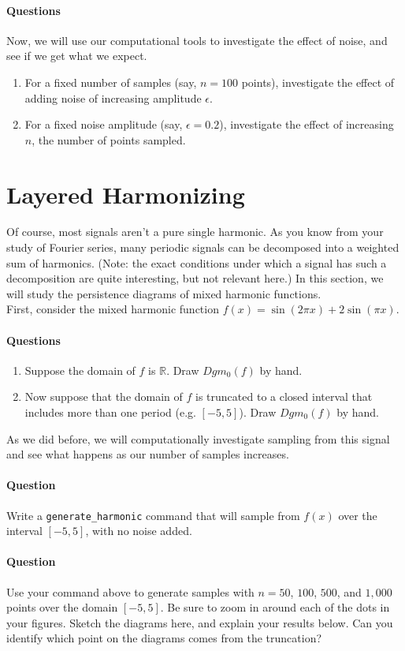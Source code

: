 \documentclass[12pt,twoside]{article}
\newcommand{\qns}{\paragraph*{Questions}}
\newcommand{\qn}{\paragraph*{Question}}
\begin{document}
\qns Now, we will use our computational tools to investigate the effect of noise, and see if we get what we expect.\begin{enumerate}
   \item For a fixed number of samples (say, $n=100$ points), investigate the effect of adding noise of increasing amplitude $\epsilon$.\vfill\vfill
   \item For a fixed noise amplitude (say, $\epsilon=0.2$), investigate the effect of increasing $n$, the number of points sampled.\vfill\vfill
\end{enumerate}

\pagebreak

\section{Layered Harmonizing}

Of course, most signals aren't a pure single harmonic.  As you know from your study of Fourier series, many periodic signals can be decomposed into a weighted sum of harmonics.  (Note: the exact conditions under which a signal has such a decomposition are quite interesting, but not relevant here.)  In this section, we will study the persistence diagrams of mixed harmonic functions.\\

First, consider the mixed harmonic function $f(x)=\sin(2\pi x)+2\sin(\pi x)$.  

\qns \begin{enumerate}   
   \item Suppose the domain of $f$ is $\mathbb{R}$.  Draw $Dgm_0(f)$ by hand.\vfill
   \item Now suppose that the domain of $f$ is truncated to a closed interval that includes more than one period (e.g. $[-5,5]$).  Draw $Dgm_0(f)$ by hand.\vfill
\end{enumerate}

As we did before, we will computationally investigate sampling from this signal and see what happens as our number of samples increases.

\qn Write a \verb|generate_harmonic| command that will sample from $f(x)$ over the interval $[-5,5]$, with no noise added.\vspace{0.5in}

\pagebreak

\qn Use your command above to generate samples with $n=50$, $100$, $500$, and $1,000$ points over the domain $[-5,5]$. Be sure to zoom in around each of the dots in your figures.  Sketch the diagrams here, and explain your results below.  Can you identify which point on the diagrams comes from the truncation?
\end{document}

